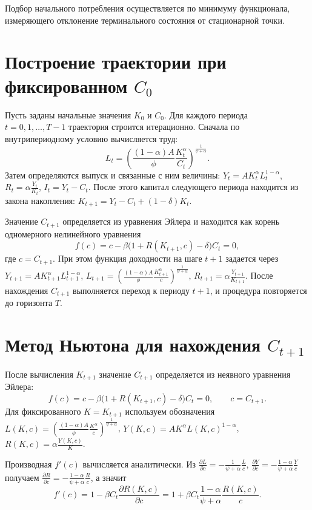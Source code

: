 Подбор начального потребления осуществляется по минимуму функционала, измеряющего отклонение терминального состояния от стационарной точки.
    
\section{Построение траектории при фиксированном \texorpdfstring{$C_0$}{C0}}

    Пусть заданы начальные значения $K_0$ и $C_0$. Для каждого периода $t=0,1,\dots,T-1$ траектория строится итерационно. Сначала по внутрипериодному условию вычисляется труд:
    \[
    L_t=\left(\frac{(1-\alpha)A}{\phi}\frac{K_t^\alpha}{C_t}\right)^{\frac{1}{\psi+\alpha}}.
    \]
    Затем определяются выпуск и связанные с ним величины:
    \(Y_t=A K_t^\alpha L_t^{1-\alpha}\),
    \(R_t=\alpha\frac{Y_t}{K_t}\),
    \(I_t=Y_t-C_t\).
    После этого капитал следующего периода находится из закона накопления:
    \(K_{t+1}=Y_t-C_t+(1-\delta)K_t\).

    Значение $C_{t+1}$ определяется из уравнения Эйлера и находится как корень одномерного нелинейного уравнения
    \[
    f(c)=c-\beta\bigl(1+R(K_{t+1},c)-\delta\bigr)C_t=0,
    \]
    где \(c=C_{t+1}\).
    При этом функция доходности на шаге \(t+1\) задается через
    \(Y_{t+1}=A K_{t+1}^\alpha L_{t+1}^{1-\alpha}\),
    \(L_{t+1}=\left(\frac{(1-\alpha)A}{\phi}\frac{K_{t+1}^\alpha}{c}\right)^{\frac{1}{\psi+\alpha}}\),
    \(R_{t+1}=\alpha\frac{Y_{t+1}}{K_{t+1}}\).
    После нахождения \(C_{t+1}\) выполняется переход к периоду \(t+1\), и процедура повторяется до горизонта \(T\).
\section{Метод Ньютона для нахождения \texorpdfstring{$C_{t+1}$}{C(t+1)}}

    После вычисления \(K_{t+1}\) значение \(C_{t+1}\) определяется из неявного уравнения Эйлера:
    \[
    f(c)=c-\beta\bigl(1+R(K_{t+1},c)-\delta\bigr)C_t=0,\qquad c=C_{t+1}.
    \]
    Для фиксированного \(K=K_{t+1}\) используем обозначения
    \(L(K,c)=\left(\frac{(1-\alpha)A}{\phi}\frac{K^\alpha}{c}\right)^{\frac{1}{\psi+\alpha}}\),
    \(Y(K,c)=A K^\alpha L(K,c)^{1-\alpha}\),
    \(R(K,c)=\alpha\frac{Y(K,c)}{K}\).

    Производная \(f'(c)\) вычисляется аналитически. Из
    \(\frac{\partial L}{\partial c}=-\frac{1}{\psi+\alpha}\frac{L}{c}\),
    \(\frac{\partial Y}{\partial c}=-\frac{1-\alpha}{\psi+\alpha}\frac{Y}{c}\)
    получаем
    \(\frac{\partial R}{\partial c}=-\frac{1-\alpha}{\psi+\alpha}\frac{R}{c}\), а значит
    \[
    f'(c)=1-\beta C_t\frac{\partial R(K,c)}{\partial c}
    =1+\beta C_t\frac{1-\alpha}{\psi+\alpha}\frac{R(K,c)}{c}.
    \]

